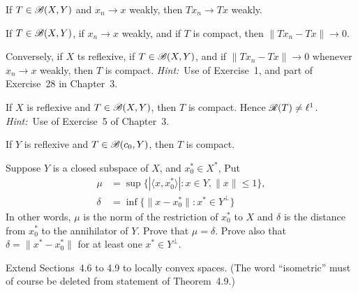 \begin{enumerate}
\begin{excopy}
\begin{itemize}
If \(T \in \mathscr{B}(X,Y)\) and \(x_n \to x\) weakly, then \(Tx_n \to Tx\) weakly.

If \(T \in \mathscr{B}(X,Y)\), if \(x_n \to x\) weakly, and if $T$ is compact,
 then \(\|Tx_n - Tx\| \to 0\).

Conversely, if $X$ ts reflexive, if \(T \in \mathscr{B}(X,Y)\),
 and if \(\|Tx_n - Tx\| \to 0\) whenever
\(x_n \to x\) weakly, then $T$ is compact.
\emph{Hint:}~Use  of Exercise~1, and part  of Exercise~28
 in Chapter~3.

If $X$ is reflexive and \(T \in \mathscr{B}(X,Y)\), then $T$ is compact.
 Hence \(\mathscr{R}(T) \neq \ell^1\).
\emph{Hint:}~Use  of Exercise~5 of Chapter~3.

If $Y$ is reflexive and \(T\in \mathscr{B}(c_0, Y)\), then $T$ is compact.

\end{itemize}

\end{excopy}

\begin{itemize}







\end{itemize}


\unfinished

\begin{excopy}
Suppose $Y$ is a closed subspace of $X$, and \(x_0^* \in X^*\), Put
\begin{align*}
\mu &= \sup\{|\langle x, x_0^*\rangle|: x\in Y, \|x\| \leq 1\}, \\
\delta &= \inf\{\| x -  x_0^*\|: x^*\in Y^\perp\}
\end{align*}
In other words, \(\mu\) is the norm of the restriction of \(x_0^*\) to $X$
 and \(\delta\) is the distance from
\(x_0^*\) to the annihilator of $Y$. Prove that \(\mu = \delta\).
 Prove also that \(\delta = \|x^* - x_0^*\|\) for at
least one \(x^* \in Y^\perp \).
\end{excopy}


\unfinished

\begin{excopy}
Extend Sections~4.6 to 4.9 to locally convex spaces.
 (The word ``isometric'' must of
course be deleted from statement of Theorem~4.9.)
\end{excopy}



\end{enumerate}
